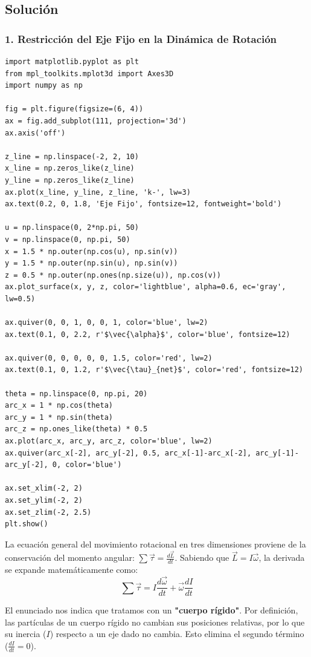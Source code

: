 \documentclass[12pt, a4paper]{article}
\begin{document}
\subsection*{Solución}

\subsubsection*{1. Restricción del Eje Fijo en la Dinámica de Rotación}

\begin{verbatim}
import matplotlib.pyplot as plt
from mpl_toolkits.mplot3d import Axes3D
import numpy as np

fig = plt.figure(figsize=(6, 4))
ax = fig.add_subplot(111, projection='3d')
ax.axis('off')

z_line = np.linspace(-2, 2, 10)
x_line = np.zeros_like(z_line)
y_line = np.zeros_like(z_line)
ax.plot(x_line, y_line, z_line, 'k-', lw=3)
ax.text(0.2, 0, 1.8, 'Eje Fijo', fontsize=12, fontweight='bold')

u = np.linspace(0, 2*np.pi, 50)
v = np.linspace(0, np.pi, 50)
x = 1.5 * np.outer(np.cos(u), np.sin(v))
y = 1.5 * np.outer(np.sin(u), np.sin(v))
z = 0.5 * np.outer(np.ones(np.size(u)), np.cos(v))
ax.plot_surface(x, y, z, color='lightblue', alpha=0.6, ec='gray', lw=0.5)

ax.quiver(0, 0, 1, 0, 0, 1, color='blue', lw=2)
ax.text(0.1, 0, 2.2, r'$\vec{\alpha}$', color='blue', fontsize=12)

ax.quiver(0, 0, 0, 0, 0, 1.5, color='red', lw=2)
ax.text(0.1, 0, 1.2, r'$\vec{\tau}_{net}$', color='red', fontsize=12)

theta = np.linspace(0, np.pi, 20)
arc_x = 1 * np.cos(theta)
arc_y = 1 * np.sin(theta)
arc_z = np.ones_like(theta) * 0.5
ax.plot(arc_x, arc_y, arc_z, color='blue', lw=2)
ax.quiver(arc_x[-2], arc_y[-2], 0.5, arc_x[-1]-arc_x[-2], arc_y[-1]-arc_y[-2], 0, color='blue')

ax.set_xlim(-2, 2)
ax.set_ylim(-2, 2)
ax.set_zlim(-2, 2.5)
plt.show()
\end{verbatim}

La ecuación general del movimiento rotacional en tres dimensiones proviene de la conservación del momento angular: $\sum \vec{\tau} = \frac{d\vec{L}}{dt}$.
Sabiendo que $\vec{L} = I\vec{\omega}$, la derivada se expande matemáticamente como:
$$\sum \vec{\tau} = I \frac{d\vec{\omega}}{dt} + \vec{\omega} \frac{dI}{dt}$$

El enunciado nos indica que tratamos con un \textbf{"cuerpo rígido"}. Por definición, las partículas de un cuerpo rígido no cambian sus posiciones relativas, por lo que su inercia ($I$) respecto a un eje dado no cambia. Esto elimina el segundo término ($\frac{dI}{dt} = 0$).
\end{document}

